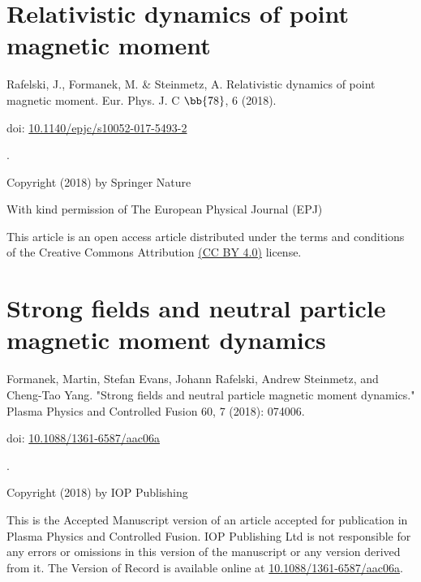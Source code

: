 \chapter{Relativistic dynamics of point magnetic moment}
\begin{center}
Rafelski, J., Formanek, M. \& Steinmetz, A. Relativistic dynamics of point magnetic moment. Eur. Phys. J. C $\bb{78}$, 6 (2018).

doi: \href{https://doi.org/10.1140/epjc/s10052-017-5493-2}{10.1140/epjc/s10052-017-5493-2}

.

Copyright (2018) by Springer Nature

With kind permission of The European Physical Journal (EPJ)

This article is an open access article distributed under the terms and conditions of the Creative Commons Attribution \href{https://creativecommons.org/licenses/by/4.0/}{(CC BY 4.0)} license.
\end{center}


\chapter{Strong fields and neutral particle magnetic
moment dynamics}
\begin{center}
Formanek, Martin, Stefan Evans, Johann Rafelski, Andrew Steinmetz, and Cheng-Tao Yang. "Strong fields and neutral particle magnetic moment dynamics." Plasma Physics and Controlled Fusion 60, 7 (2018): 074006.

doi: \href{https://doi.org/10.1088/1361-6587/aac06a}{10.1088/1361-6587/aac06a}

.

Copyright (2018) by IOP Publishing

This is the Accepted Manuscript version of an article accepted for publication in Plasma Physics and Controlled Fusion.  IOP Publishing Ltd is not responsible for any errors or omissions in this version of the manuscript or any version derived from it.  The Version of Record is available online at \href{https://doi.org/10.1088/1361-6587/aac06a}{10.1088/1361-6587/aac06a}.

\end{center}


